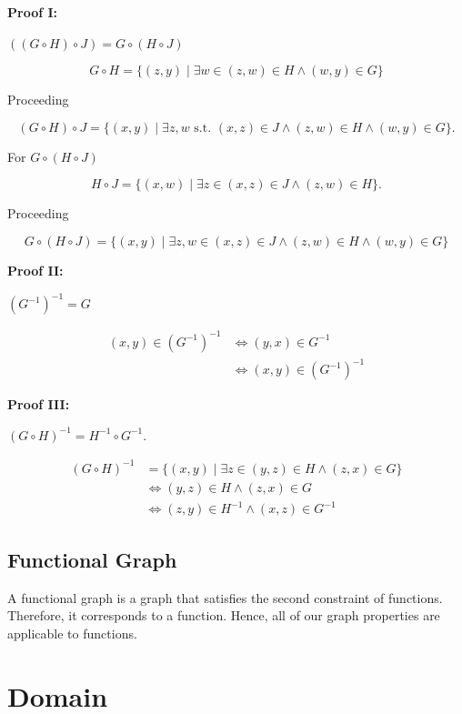 \textbf{Proof I:}

\(((G \circ H) \circ J) = G \circ (H \circ J)\)

\[
	G \circ H = \{(z, y) \mid \exists w \in (z, w) \in H \land (w, y) \in G\}
\]

Proceeding

\[
	(G \circ H) \circ J = \{(x, y) \mid \exists z,w \text{ s.t. }  (x, z) \in J \land  (z, w) \in H \land (w, y) \in G  \}.
\]

For \(G \circ (H \circ J)\)

\[
	H \circ J = \{(x, w) \mid \exists z \in (x, z) \in J \land (z, w) \in H\}.
\]

Proceeding

\[
	G \circ (H \circ J) = \{(x, y) \mid \exists z,w \in  (x, z) \in J \land  (z, w) \in H \land (w, y) \in G  \}
\]

\QED

\textbf{Proof II:}

\((G^{-1})^{-1} = G\)

\begin{align*}
	(x, y) \in (G^{-1})^{-1} & \iff (y, x) \in G^{-1}        \\
	                         & \iff (x, y) \in (G^{-1})^{-1}
\end{align*}

\QED

\textbf{Proof III:}

\((G \circ H)^{-1} = H^{-1} \circ G^{-1}\).

\begin{align*}
	(G \circ H)^{-1} & =  \{(x, y) \mid \exists z \in (y, z) \in H \land (z, x) \in G\} \\
	                 & \iff (y, z) \in H \land (z, x) \in G                             \\
	                 & \iff (z, y) \in H^{-1} \land (x, z) \in G^{-1}
\end{align*}

\QED

\subsection{Functional Graph}

A functional graph is a graph that satisfies the second constraint of functions. Therefore, it corresponds to a function. Hence,
all of our graph properties are applicable to functions.

\section{Domain}

